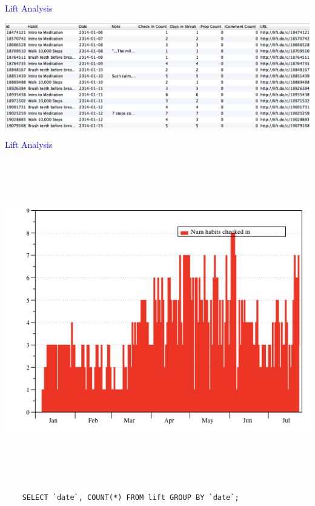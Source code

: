 \documentclass[landscape]{slides}
\begin{document}
\begin{slide}

    \textcolor{blue}{\Large{Lift Analysis}}

    \begin{center}
        \includegraphics[width=20cm]{lift-data}
    \end{center}

\end{slide}


\begin{slide}

    \textcolor{blue}{\Large{Lift Analysis}}

    \begin{center}
        \includegraphics[height=14cm]{lift-checkins}
    \end{center}

    \begin{small}
    \begin{verbatim}
    SELECT `date`, COUNT(*) FROM lift GROUP BY `date`;
    \end{verbatim}
    \end{small}

\end{slide}
\end{document}
